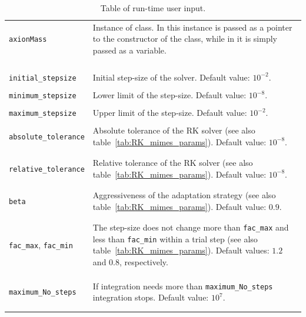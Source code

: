 \documentclass[11pt,a4paper]{article}
\begin{document}
\begin{table}[h!]
\begin{tabular}{l l}
		{\tt axionMass} &\multirow{1}{12cm}{Instance of \cppin{mimes::AxionMass<LD>} class. In \CPP this instance is passed as a pointer to the constructor
		of the \cppin{mimes::Axion<LD,Solver,Method>} class, while in \PY it is simply passed as a variable.}\\ \\  \\ \\
		\hline\\[-0.4cm]

		{\tt initial\_stepsize} &  Initial step-size of the solver. Default value: $10^{-2}$.\\ 
		\hline\\[-0.4cm]

		{\tt minimum\_stepsize} & Lower limit of the step-size. Default value:  $10^{-8}$.\\
		\hline\\[-0.4cm]

		{\tt maximum\_stepsize} & Upper limit of the step-size. Default value:  $10^{-2}$.\\
		\hline\\[-0.4cm]

		{\tt absolute\_tolerance} & \multirow{1}{12cm}{Absolute tolerance of the RK solver	(see also table~\ref{tab:RK_mimes_params}).  Default value:  $10^{-8}$.}\\\\
		\hline\\[-0.4cm]

		{\tt relative\_tolerance} & \multirow{1}{12cm}{Relative tolerance of the RK solver	(see also table~\ref{tab:RK_mimes_params}).  Default value:  $10^{-8}$.}\\\\
		\hline\\[-0.4cm]
		
		{\tt beta} & \multirow{1}{12cm}{Aggressiveness of the adaptation strategy	(see also table~\ref{tab:RK_mimes_params}).  Default value:  $0.9$.}\\\\
		\hline\\[-0.4cm]

		{\tt fac\_max}, {\tt fac\_min} &\multirow{1}{12cm}{The step-size does not change more than {\tt fac\_max} and less than {\tt fac\_min} within a trial step (see also table~\ref{tab:RK_mimes_params}). Default values: $1.2$ and $0.8$, respectively.} \\ \\ \\ 
		\hline\\[-0.4cm]
		
		{\tt maximum\_No\_steps} & \multirow{1}{12cm}{If integration needs more than {\tt maximum\_No\_steps} integration stops. Default value: $10^7$.}\\\\
		\hline\\[-0.4cm]
	\end{tabular}
	\caption{Table of run-time user input.}
	\label{tab:run_time-input}
\end{table}
		
\end{document}
